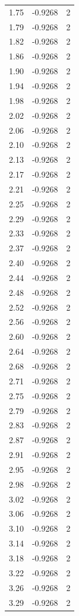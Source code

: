 \begin{longtable}{lrr}
  1.75 & -0.9268 & 2 \\
  1.79 & -0.9268 & 2 \\
  1.82 & -0.9268 & 2 \\
  1.86 & -0.9268 & 2 \\
  1.90 & -0.9268 & 2 \\
  1.94 & -0.9268 & 2 \\
  1.98 & -0.9268 & 2 \\
  2.02 & -0.9268 & 2 \\
  2.06 & -0.9268 & 2 \\
  2.10 & -0.9268 & 2 \\
  2.13 & -0.9268 & 2 \\
  2.17 & -0.9268 & 2 \\
  2.21 & -0.9268 & 2 \\
  2.25 & -0.9268 & 2 \\
  2.29 & -0.9268 & 2 \\
  2.33 & -0.9268 & 2 \\
  2.37 & -0.9268 & 2 \\
  2.40 & -0.9268 & 2 \\
  2.44 & -0.9268 & 2 \\
  2.48 & -0.9268 & 2 \\
  2.52 & -0.9268 & 2 \\
  2.56 & -0.9268 & 2 \\
  2.60 & -0.9268 & 2 \\
  2.64 & -0.9268 & 2 \\
  2.68 & -0.9268 & 2 \\
  2.71 & -0.9268 & 2 \\
  2.75 & -0.9268 & 2 \\
  2.79 & -0.9268 & 2 \\
  2.83 & -0.9268 & 2 \\
  2.87 & -0.9268 & 2 \\
  2.91 & -0.9268 & 2 \\
  2.95 & -0.9268 & 2 \\
  2.98 & -0.9268 & 2 \\
  3.02 & -0.9268 & 2 \\
  3.06 & -0.9268 & 2 \\
  3.10 & -0.9268 & 2 \\
  3.14 & -0.9268 & 2 \\
  3.18 & -0.9268 & 2 \\
  3.22 & -0.9268 & 2 \\
  3.26 & -0.9268 & 2 \\
  3.29 & -0.9268 & 2 \\

\end{longtable}
